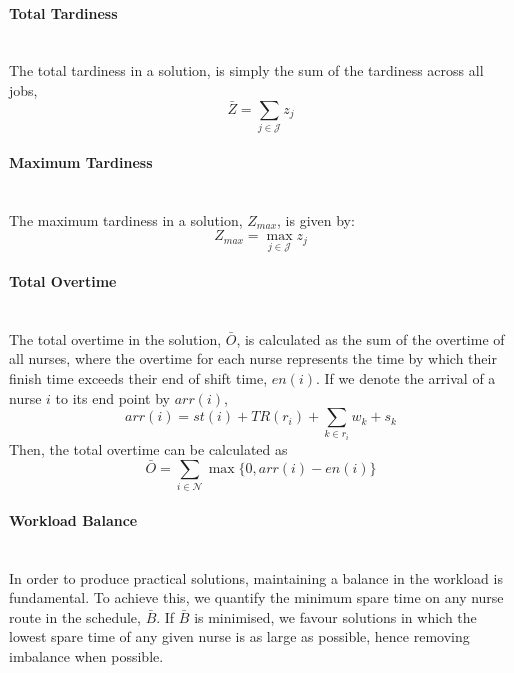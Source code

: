 \documentclass[a4paper,11pt]{elsarticle}
\begin{document}
\paragraph{Total Tardiness}\ \\
The total tardiness in a solution, is simply the sum of the tardiness across all jobs,
\begin{equation}
    \bar{Z} = \sum_{j \in \mathcal{J}} z_j
\end{equation}

\paragraph{Maximum Tardiness}\ \\
The maximum tardiness in a solution, $Z_{max}$, is given by:
\begin{equation}
    Z_{max} = \max_{j \in \mathcal{J}} z_j
\end{equation}

\paragraph{Total Overtime}\ \\
The total overtime in the solution, $\bar{O}$, is calculated as the sum of the overtime of all nurses, where the overtime for each nurse represents the time by which their finish time exceeds their end of shift time, $en(i)$. If we denote the arrival of a nurse $i$ to its end point by $arr(i)$,
\begin{equation}
	arr(i) = st(i) + TR(r_i) + \sum_{k \in r_i} w_k + s_k
\end{equation}
Then, the total overtime can be calculated as
\begin{equation}
     \bar{O} = \sum_{i \in \mathcal{N}} \max \{0, arr(i) - en(i)\}
\end{equation}

\paragraph{Workload Balance}\ \\

In order to produce practical solutions, maintaining a balance in the workload is fundamental. To achieve this, we quantify the minimum spare time on any nurse route in the schedule, $\bar{B}$. If $\bar{B}$ is minimised, we favour solutions in which the lowest spare time of any given nurse is as large as possible, hence removing imbalance when possible.
\end{document}
